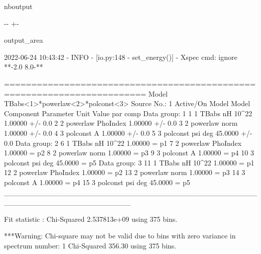\documentclass[letterpaper,10pt,english]{sphinxmanual}
\newlength\nbsphinxcodecellspacing
\begin{document}
\begin{sphinxuseclass}{nboutput}
{

\kern-\sphinxverbatimsmallskipamount\kern-\baselineskip
\kern+\FrameHeightAdjust\kern-\fboxrule
\vspace{\nbsphinxcodecellspacing}

\begin{sphinxuseclass}{output_area}
\begin{sphinxuseclass}{}


\begin{sphinxVerbatim}[commandchars=\\\{\}]
2022-06-24 10:43:42 -    INFO - [io.py:148 - set\_energy()] - Xspec cmd: ignore **-2.0 8.0-**

========================================================================
Model TBabs<1>*powerlaw<2>*polconst<3> Source No.: 1   Active/On
Model Model Component  Parameter  Unit     Value
 par  comp
                           Data group: 1
   1    1   TBabs      nH         10\^{}22    1.00000      +/-  0.0
   2    2   powerlaw   PhoIndex            1.00000      +/-  0.0
   3    2   powerlaw   norm                1.00000      +/-  0.0
   4    3   polconst   A                   1.00000      +/-  0.0
   5    3   polconst   psi        deg      45.0000      +/-  0.0
                           Data group: 2
   6    1   TBabs      nH         10\^{}22    1.00000      = p1
   7    2   powerlaw   PhoIndex            1.00000      = p2
   8    2   powerlaw   norm                1.00000      = p3
   9    3   polconst   A                   1.00000      = p4
  10    3   polconst   psi        deg      45.0000      = p5
                           Data group: 3
  11    1   TBabs      nH         10\^{}22    1.00000      = p1
  12    2   powerlaw   PhoIndex            1.00000      = p2
  13    2   powerlaw   norm                1.00000      = p3
  14    3   polconst   A                   1.00000      = p4
  15    3   polconst   psi        deg      45.0000      = p5
\_\_\_\_\_\_\_\_\_\_\_\_\_\_\_\_\_\_\_\_\_\_\_\_\_\_\_\_\_\_\_\_\_\_\_\_\_\_\_\_\_\_\_\_\_\_\_\_\_\_\_\_\_\_\_\_\_\_\_\_\_\_\_\_\_\_\_\_\_\_\_\_


Fit statistic  : Chi-Squared              2.537813e+09     using 375 bins.

***Warning: Chi-square may not be valid due to bins with zero variance
            in spectrum number: 1
                 Chi-Squared                  356.30     using 375 bins.


\end{sphinxVerbatim}
\end{sphinxuseclass}
\end{sphinxuseclass}}
\end{sphinxuseclass}
\end{document}
